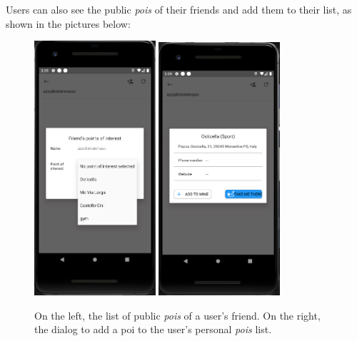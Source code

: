 \documentclass[../../main]{subfiles}
\begin{document}
\noindent
Users can also see the public \textit{pois} of their friends and add them to their list, as shown in the pictures below:
\begin{figure}[H]
    \centering
    \includegraphics[width=0.4\textwidth]{images/app/friend/friend_poi}
    \includegraphics[width=0.4\textwidth]{images/app/friend/add_friend_poi}
    \caption{On the left, the list of public \textit{pois} of a user's friend. On the right, the dialog to add a poi to the user's personal \textit{pois} list.}
\end{figure}
\end{document}

